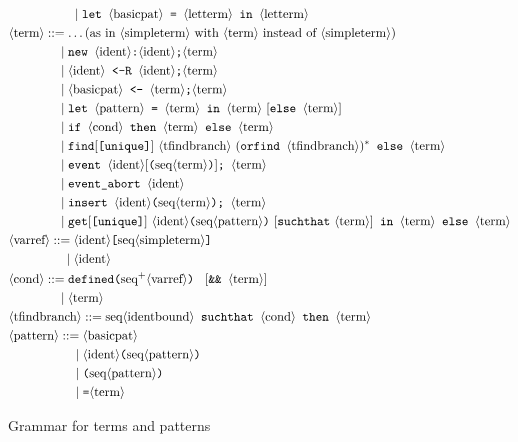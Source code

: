 \begin{figure}
\begin{align*}
&\phlt \texttt{let } \nonterm{basicpat} \texttt{ = }\nonterm{letterm}\texttt{ in }\nonterm{letterm}\\
&\nonterm{term} ::= \ldots \text{(as in $\nonterm{simpleterm}$ with 
$\nonterm{term}$ instead of $\nonterm{simpleterm}$)}\\
&\pht \Resavt\texttt{;}\nonterm{term}\\
&\pht \Resbvt\texttt{;}\nonterm{term}\\
&\pht \nonterm{basicpat} \texttt{ <- } \nonterm{term}\texttt{;}\nonterm{term}\\
&\pht \texttt{let } \nonterm{pattern} \texttt{ = }\nonterm{term}\texttt{ in }\nonterm{term}\ [\texttt{else }\nonterm{term}]\\
&\pht \texttt{if }\nonterm{cond}\texttt{ then } \nonterm{term} \texttt{ else }\nonterm{term}\\
&\pht \texttt{find}[\texttt{[unique]}]\ \nonterm{tfindbranch}\ (\texttt{orfind }\nonterm{tfindbranch})^*\texttt{ else }\nonterm{term}\\
&\pht \texttt{event }\nonterm{ident}[\texttt{(}\seq{term}\texttt{)}]\texttt{; }\nonterm{term}\\
&\pht \texttt{event\string_abort }\nonterm{ident}\\
&\pht \texttt{insert }\nonterm{ident}\texttt{(}\seq{term}\texttt{)}\texttt{; }\nonterm{term}\\
&\pht \texttt{get}[\texttt{[unique]}]\ \nonterm{ident}\texttt{(}\seq{pattern}\texttt{)}\ [\texttt{suchthat}\ \nonterm{term}]\texttt{ in }\nonterm{term}\texttt{ else }\nonterm{term}\\
&\nonterm{varref} ::= \nonterm{ident}\texttt{[}\seq{simpleterm}\texttt{]}\\
&\phantom{\nonterm{varref} =}\mid \nonterm{ident}\\
&\nonterm{cond} ::= \texttt{defined(} \neseq{varref} \texttt{) }\ [\texttt{\&\& }\nonterm{term}]\\
&\phantom{\nonterm{cond} = }\mid \nonterm{term}\\
&\nonterm{tfindbranch} ::= \seq{identbound} \texttt{ suchthat } \nonterm{cond} \texttt{ then }\nonterm{term}\\
&\nonterm{pattern} ::= \nonterm{basicpat}\\
&\phpat \nonterm{ident}\texttt{(} \seq{pattern}\texttt{)}\\
&\phpat \texttt{(} \seq{pattern}\texttt{)}\\
&\phpat \texttt{=} \nonterm{term}
\end{align*}
\caption{Grammar for terms and patterns}
\label{fig:syntax1}
\end{figure}

